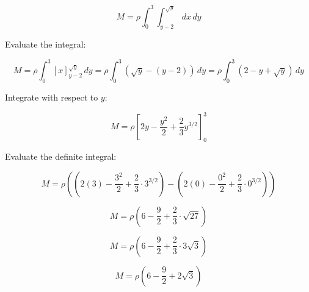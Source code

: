 \documentclass{article}
\begin{document}
\[
M = \rho \int_{0}^{3} \int_{y-2}^{\sqrt{y}} \, dx \, dy
\]



Evaluate the integral:


\[
M = \rho \int_{0}^{3} \left[ x \right]_{y-2}^{\sqrt{y}} \, dy = \rho \int_{0}^{3} \left( \sqrt{y} - (y - 2) \right) \, dy = \rho \int_{0}^{3} (2 - y + \sqrt{y}) \, dy
\]



Integrate with respect to \( y \):


\[
M = \rho \left[ 2y - \frac{y^2}{2} + \frac{2}{3}y^{3/2} \right]_{0}^{3}
\]



Evaluate the definite integral:


\[
M = \rho \left( \left( 2(3) - \frac{3^2}{2} + \frac{2}{3} \cdot 3^{3/2} \right) - \left( 2(0) - \frac{0^2}{2} + \frac{2}{3} \cdot 0^{3/2} \right) \right)
\]




\[
M = \rho \left( 6 - \frac{9}{2} + \frac{2}{3} \cdot \sqrt{27} \right)
\]




\[
M = \rho \left( 6 - \frac{9}{2} + \frac{2}{3} \cdot 3\sqrt{3} \right)
\]




\[
M = \rho \left( 6 - \frac{9}{2} + 2\sqrt{3} \right)
\]


\]
\end{document}
